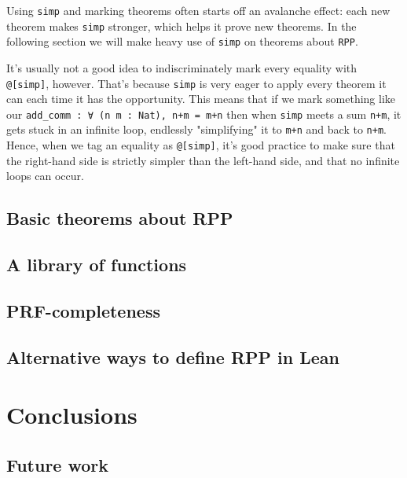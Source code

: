 \documentclass{book}
\theoremstyle{definition}
\theoremstyle{remark}
\theoremstyle{plain}
\begin{document}
Using \lstinline{simp} and marking theorems often starts off an avalanche effect:
each new theorem makes \lstinline{simp} stronger, which helps it prove new theorems.
In the following section we will make heavy use of \lstinline{simp} on theorems about \lstinline{RPP}.

It's usually not a good idea to indiscriminately mark every equality with \lstinline{@[simp]}, however.
That's because \lstinline{simp} is very eager to apply every theorem it can each time it has the opportunity.
This means that if we mark something like our \lstinline{add_comm : ∀ (n m : Nat), n+m = m+n}
then when \lstinline{simp} meets a sum \lstinline{n+m}, it gets stuck in an infinite loop,
endlessly "simplifying" it to \lstinline{m+n} and back to \lstinline{n+m}.
Hence, when we tag an equality as \lstinline{@[simp]},
it's good practice to make sure that the right-hand side is strictly simpler than the left-hand side,
and that no infinite loops can occur.

\section{Basic theorems about RPP}

\section{A library of functions}

\section{PRF-completeness}

\section{Alternative ways to define RPP in Lean}

\chapter{Conclusions}

\section{Future work}
\end{document}
